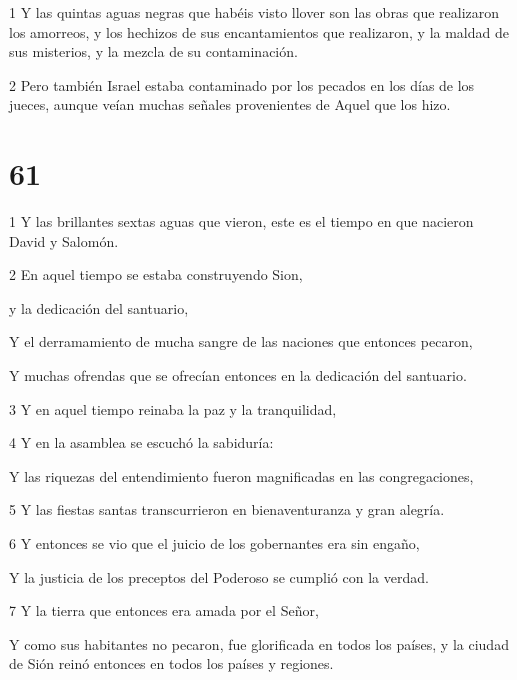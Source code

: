 \par 1 Y las quintas aguas negras que habéis visto llover son las obras que realizaron los amorreos, y los hechizos de sus encantamientos que realizaron, y la maldad de sus misterios, y la mezcla de su contaminación.

\par 2 Pero también Israel estaba contaminado por los pecados en los días de los jueces, aunque veían muchas señales provenientes de Aquel que los hizo.

\chapter{61}

\par 1 Y las brillantes sextas aguas que vieron, este es el tiempo en que nacieron David y Salomón.

\par 2 En aquel tiempo se estaba construyendo Sion,

\par y la dedicación del santuario,

\par Y el derramamiento de mucha sangre de las naciones que entonces pecaron,

\par Y muchas ofrendas que se ofrecían entonces en la dedicación del santuario.

\par 3 Y en aquel tiempo reinaba la paz y la tranquilidad,

\par 4 Y en la asamblea se escuchó la sabiduría:

\par Y las riquezas del entendimiento fueron magnificadas en las congregaciones,

\par 5 Y las fiestas santas transcurrieron en bienaventuranza y gran alegría.

\par 6 Y entonces se vio que el juicio de los gobernantes era sin engaño,

\par Y la justicia de los preceptos del Poderoso se cumplió con la verdad.

\par 7 Y la tierra que entonces era amada por el Señor,

\par Y como sus habitantes no pecaron, fue glorificada en todos los países, y la ciudad de Sión reinó entonces en todos los países y regiones.


